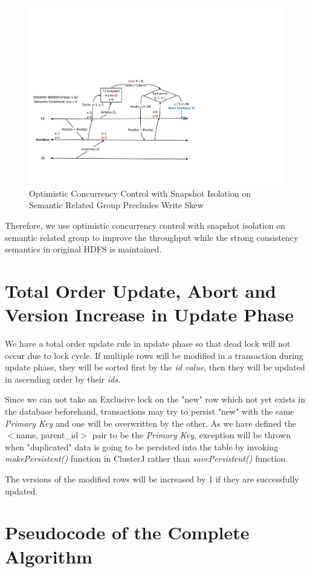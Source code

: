 \begin{figure}[h]
	\centering
	\includegraphics[width=\linewidth]{figs/snapwriteskew.pdf}
	\caption{Optimistic Concurrency Control with Snapshot Isolation on Semantic Related Group Precludes Write Skew}
	\label{fig:snapwriteskew}
\end{figure}

\noindent Therefore, we use optimistic concurrency control with snapshot isolation on semantic related group to improve the throughput while the strong consistency semantics in original HDFS is maintained.

\section{Total Order Update, Abort and Version Increase in Update Phase}
We have a total order update rule in update phase so that dead lock will not occur due to lock cycle. If multiple rows will be modified in a transaction during update phase, they will be sorted first by the \textit{id value}, then they will be updated in ascending order by their \textit{ids}. 

\noindent Since we can not take an Exclusive lock on the "new" row which not yet exists in the database beforehand, transactions may try to persist "new" with the same \textit{Primary Key} and one will be overwritten by the other. As we have defined the $<$name, parent\_id$>$ pair to be the \textit{Primary Key}, exception will be thrown when "duplicated" data is going to be persisted into the table by invoking \textit{makePersistent()} function in ClusterJ rather than \textit{savePersistent()} function.

\noindent The versions of the modified rows will be increased by 1 if they are successfully updated.
\section{Pseudocode of the Complete Algorithm}
